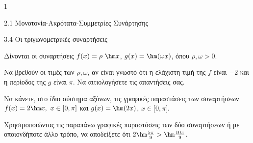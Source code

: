 \begin{ylh}{1}
\item 2.1 Μονοτονία-Ακρότατα-Συμμετρίες Συνάρτησης
\item 3.4 Οι τριγωνομετρικές συναρτήσεις
\end{ylh}
Δίνονται οι συναρτήσεις $f(x) = \rho\ \hm  x$, $g(x) = \hm (\omega x)$, όπου $\rho,\omega > 0.$
\begin{alist}
\item Να βρεθούν οι τιμές των $\rho,\omega$, αν είναι γνωστό ότι η ελάχιστη τιμή της $f$ είναι $- 2$ και η περίοδος της $g$ είναι $\pi$. Να αιτιολογήσετε τις απαντήσεις σας.
\item
\end{alist}
\begin{alist}
\item
  Να κάνετε, στο ίδιο σύστημα αξόνων, τις γραφικές παραστάσεις των συναρτήσεων $f(x) = 2\hm  x,\ x \in \lbrack 0,\pi\rbrack$ και $g(x) = \hm (2x)$, $x \in \lbrack 0,\pi\rbrack.$
\end{alist}
\begin{alist}
\item
  Χρησιμοποιώντας τις παραπάνω γραφικές παραστάσεις των δύο συναρτήσεων ή με οποιονδήποτε άλλο τρόπο, να αποδείξετε ότι $2\hm \frac{5\pi}{9} > \hm \frac{10\pi}{9}$.
\end{alist}

